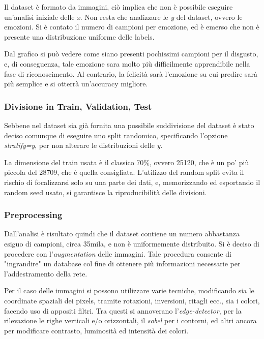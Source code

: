 \documentclass[target=mst]{thud}
\begin{document}
Il dataset è formato da immagini, ciò implica che non è possibile eseguire un'analisi iniziale delle \textit{x}. Non resta che analizzare le \textit{y} del dataset, ovvero le emozioni. Si è contato il numero di campioni per emozione, ed è emerso che non è presente una distribuzione uniforme delle labels. 

Dal grafico si può vedere come siano presenti pochissimi campioni per il disgusto, e, di conseguenza, tale emozione sara molto più difficilmente apprendibile nella fase di riconoscimento. 
Al contrario, la felicità sarà l'emozione su cui predire sarà più semplice e si otterrà un'accuracy migliore.


 
\subsubsection{Divisione in Train, Validation, Test }
Sebbene nel dataset sia già fornita una possibile suddivisione del dataset è stato deciso comunque di eseguire uno split randomico, specificando l'opzione \textit{stratify=y}, per non alterare le distribuzioni delle \textit{y}.

La dimensione del train usata è il classico 70\%, ovvero 25120, che è un po' più piccola del 28709, che è quella consigliata.
L'utilizzo del random split evita il rischio di focalizzarsi solo su una parte dei dati, e, memorizzando ed esportando il random seed usato, si garantisce la riproducibilità delle divisioni.

\subsubsection{Preprocessing}
Dall'analisi è risultato quindi che il dataset contiene un numero abbastanza esiguo di campioni, circa 35mila, e non è uniformemente distribuito.
Si è deciso di procedere con l'\textit{augmentation} delle immagini. Tale procedura consente di "ingrandire" un database col fine di ottenere più informazioni necessarie per l'addestramento della rete. 

Per il caso delle immagini si possono utilizzare varie tecniche, modificando sia le coordinate spaziali dei pixels, tramite rotazioni, inversioni, ritagli ecc., sia i colori, facendo uso di appositi filtri. Tra questi si annoverano l'\textit{edge-detector}, per la rilevazione le righe verticali e/o orizzontali, il \textit{sobel} per i contorni, ed altri ancora per modificare contrasto, luminosità ed intensità dei colori.
\end{document}
